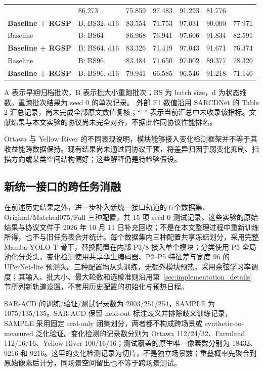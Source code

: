 \documentclass[journal]{IEEEtran}
\begin{document}
\begin{table}[!t]
\begin{tabularx}{\linewidth}{@{}Xlrrrrr@{}}
& 86.273 & 75.859 & 97.483 & 91.293 & 81.776 \\
\textbf{Baseline + RGSP}
& B: BS32, d16
& 83.554 & 71.753 & 97.031 & 90.000 & 77.971 \\
Baseline
& B: BS64
& 86.968 & 76.941 & 97.606 & 91.834 & 82.591 \\
\textbf{Baseline + RGSP}
& B: BS64, d16
& 83.326 & 71.419 & 97.043 & 91.671 & 76.374 \\
Baseline
& B: BS96
& 83.484 & 71.650 & 97.002 & 89.377 & 78.320 \\
\textbf{Baseline + RGSP}
& B: BS96, d16
& 79.941 & 66.585 & 96.546 & 91.218 & 71.146 \\
\bottomrule
\end{tabularx}
\smallskip
\begin{minipage}{\linewidth}
\footnotesize
A 表示早期归档批次，B 表示批大小重跑批次；BS 为 batch size，d 为状态维数。重跑批次结果为 seed 0 的单次记录。
外部 F1 数值沿用 SARCDNet 的 Table 2 汇总记录\cite{sarcdnet2026}，尚未完成全部原文数值复核；``--'' 表示当前汇总中未收录该指标。文献结果与本文实验的协议尚未完全对齐，不据此作同协议性能排名。
\end{minipage}
\end{table}

Ottawa 与 Yellow River 的不同表现说明，模块能够接入变化检测框架并不等于其收益能跨数据保持。现有结果尚未通过同协议干预，将差异归因于弱变化抑制、扫描方向或某类空间结构偏好；这些解释仍是待检验假设。

\FloatBarrier


\subsection{新统一接口的跨任务消融}
\label{sec:unified_cross_seed0}

在前述历史结果之外，进一步补入新统一接口轨道的五个数据集、Original/Matched075/Full 三种配置，共 15 项 seed 0 测试记录。这些实验的原始结果与协议文件于 2026 年 10 月 11 日补充回收；不是在本文整理过程中重新训练所得，也不与旧任务表合并统计。每个数据集内三种配置共享冻结划分，采用完整 Mamba-YOLO-T 骨干，替换配置在内部 P3/8 接入单个模块；分类使用 P5 全局池化分类头，变化检测使用共享孪生编码器、P2--P5 特征差与宽度 96 的 UPerNet-lite 预测头。三种配置均从头训练，无额外模块预热，采用余弦学习率调度；其输入、批大小、最大轮数和选模准则沿用第~\ref{sec:implementation_details} 节所列新轨道设置，不套用历史配置的初始化与预热日程。

SAR-ACD 的训练/验证/测试记录数为 2003/251/254，SAMPLE 为 1075/135/135。SAR-ACD 保留 held-out 标注歧义并排除歧义训练记录，SAMPLE 采用固定 real-only 闭集划分，两者都不构成跨场景或 synthetic-to-measured 泛化验证。变化检测的记录数分别为 Ottawa 112/24/32、Farmland 112/16/16、Yellow River 100/16/16；测试覆盖的原生唯一像素数分别为 18432、9216 和 9216。这里的变化检测记录为切片，不是独立场景数；重叠概率先聚合到原始像素后计分，同场景空间留出也不等于跨场景测试。
\end{document}
